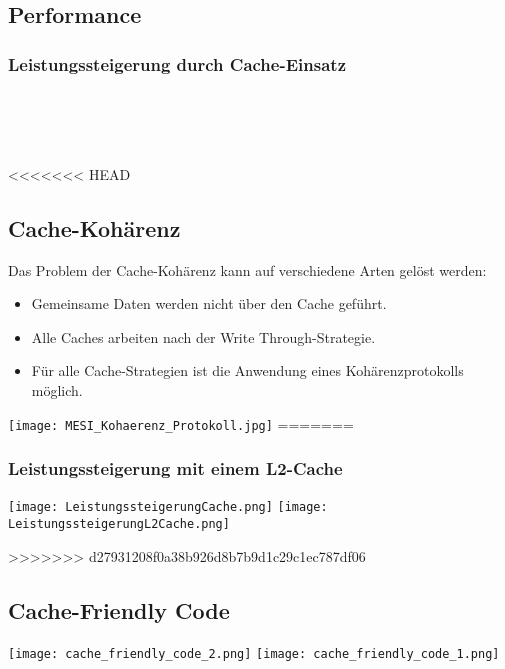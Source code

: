 \subsection{Performance}


\subsubsection{Leistungssteigerung durch Cache-Einsatz}


\\
\\
\\

<<<<<<< HEAD
\subsection{Cache-Kohärenz}

Das Problem der Cache-Kohärenz kann auf verschiedene Arten gelöst werden:

\begin{itemize}
    \itemsep-.5em 
    \item Gemeinsame Daten werden nicht über den Cache geführt.
    \item Alle Caches arbeiten nach der Write Through-Strategie.
    \item Für alle Cache-Strategien ist die Anwendung eines Kohärenzprotokolls möglich.
\end{itemize}

\texttt{[image: MESI\_Kohaerenz\_Protokoll.jpg]}
=======
\subsubsection{Leistungssteigerung mit einem L2-Cache}


\begin{center}
	\texttt{[image: LeistungssteigerungCache.png]}
	\texttt{[image: LeistungssteigerungL2Cache.png]}
\end{center}
>>>>>>> d27931208f0a38b926d8b7b9d1c29c1ec787df06


\subsection{Cache-Friendly Code}

\texttt{[image: cache\_friendly\_code\_2.png]}
\texttt{[image: cache\_friendly\_code\_1.png]}